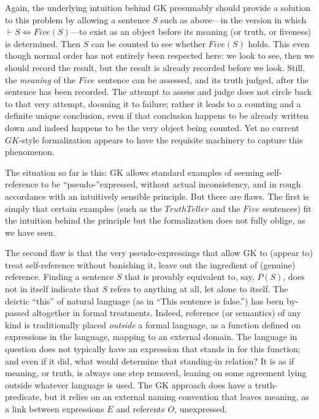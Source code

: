 \documentclass{amsart}
\begin{document}
Again, the underlying intuition behind GK presumably should provide a
solution to this problem by allowing a sentence $S$ such as above---in
the version in which $\vdash S \iff Five(S)$---to exist as an object
before its meaning (or truth, or fiveness) is determined. Then $S$ can
be counted to see whether $Five(S)$ holds. This even though normal
order has not entirely been respected here: we look to see, then we
should record the result, but the result is already recorded before we
look.  Still, the {\em meaning} of the $Five$ sentence can be
assessed, and its truth judged, after the sentence has been
recorded. The attempt to assess and judge does not circle back to that
very attempt, dooming it to failure; rather it leads to a counting and
a definite unique conclusion, even if that conclusion happens to be
already written down and indeed happens to be the very object being
counted. Yet no current $GK$-style formalization appears to have the
requisite machinery to capture this phenomenon.

The situation so far is this: GK allows standard examples of seeming
self-reference to be ``pseudo-''expressed, without actual
inconsistency, and in rough accordance with an intuitively sensible
principle. But there are flaws. The first is simply that certain
examples (such as the $TruthTeller$ and the $Five$ sentences) fit the
intuition behind the principle but the formalization does not fully
oblige, as we have seen. 

The second flaw is that the very
pseudo-expressings that allow GK to (appear to) treat self-reference
without banishing it, leave out the ingredient of (genuine)
reference. Finding a sentence $S$ that is provably equivalent to, say,
$P(S)$, does not in itself indicate that $S$ refers to anything at
all, let alone to itself. The deictic ``this'' of natural language (as
in ``This sentence is false.'') has been by-passed altogether in
formal treatments. Indeed, reference (or semantics) of any kind is
traditionally placed {\em outside} a formal language, as a function
defined on expressions in the language, mapping to an external
domain. The language in question does not typically have an expression
that stands in for this function; and even if it did, what would
determine that standing-in relation? It is as if meaning, or truth, is
always one step removed, leaning on some agreement lying outside
whatever language is used.  The GK approach does have a
truth-predicate, but it relies on an external naming convention that
leaves meaning, as a link between expressions $E$ and referents $O$,
unexpressed.
\end{document}
